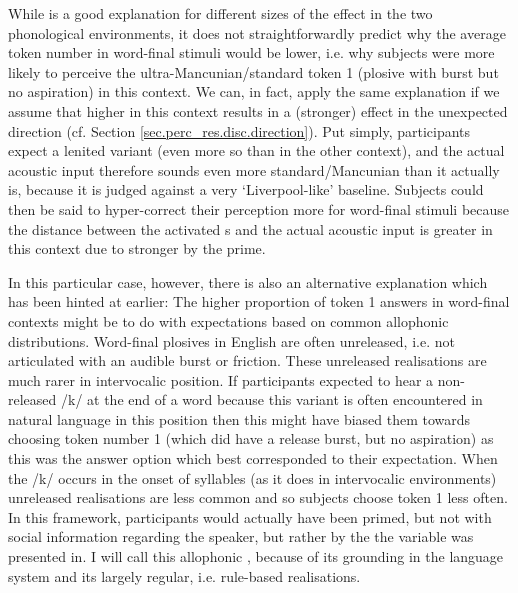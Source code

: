 While  is a good explanation for different sizes of the  effect in the two phonological environments, it does not straightforwardly predict why the average token number in word-final stimuli would be lower, i.e. why subjects were more likely to perceive the ultra-Mancunian/standard token 1 (plosive with burst but no aspiration) in this context.
We can, in fact, apply the same explanation if we assume that higher  in this context results in a (stronger)  effect in the unexpected direction (cf. Section \ref{sec.perc_res.disc.direction}).
Put simply, participants expect a lenited variant (even more so than in the other context), and the actual acoustic input therefore sounds even more standard/Mancunian than it actually is, because it is judged against a very `Liverpool-like' baseline.
Subjects could then be said to hyper-correct their perception more for word-final stimuli because the distance between the activated s and the actual acoustic input is greater in this context due to stronger  by the prime.

In this particular case, however, there is also an alternative explanation which has been hinted at earlier: The higher proportion of token 1 answers in word-final contexts might be to do with expectations based on common allophonic distributions.
Word-final plosives in English are often unreleased, i.e. not articulated with an audible burst or friction.
These unreleased realisations are much rarer in intervocalic position.
If participants expected to hear a non-released /k/ at the end of a word because this variant is often encountered in natural language in this position then this might have biased them towards choosing token number 1 (which did have a release burst, but no aspiration) as this was the answer option which best corresponded to their expectation.
When the /k/ occurs in the onset of syllables (as it does in intervocalic environments) unreleased realisations are less common and so subjects choose token 1 less often.
In this framework, participants would actually have been primed, but not with social information regarding the speaker, but rather by the  the variable was presented in.
I will call this allophonic , because of its grounding in the language system and its largely regular, i.e. rule-based realisations.

